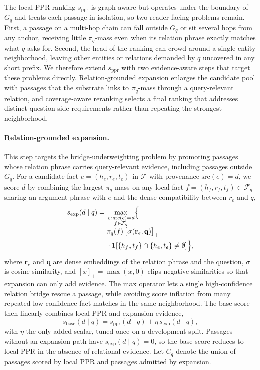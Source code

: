 The local PPR ranking $s_{\mathrm{ppr}}$ is graph-aware but operates
under the boundary of $G_q$ and treats each passage in isolation, so
two reader-facing problems remain. First, a passage on a multi-hop
chain can fall outside $G_q$ or sit several hops from any anchor,
receiving little $\pi_q$-mass even when its relation phrase exactly
matches what $q$ asks for. Second, the head of the ranking can crowd
around a single entity neighborhood, leaving other entities or
relations demanded by $q$ uncovered in any short prefix. We therefore
extend $s_{\mathrm{ppr}}$ with two evidence-aware steps that target
these problems directly. Relation-grounded expansion enlarges the
candidate pool with passages that the substrate links to $\pi_q$-mass
through a query-relevant relation, and coverage-aware reranking
selects a final ranking that addresses distinct question-side
requirements rather than repeating the strongest neighborhood.

\paragraph{Relation-grounded expansion.}
This step targets the bridge-underweighting problem by promoting
passages whose relation phrase carries query-relevant evidence,
including passages outside $G_q$. For a candidate fact
$e=(h_e, r_e, t_e)$ in $\mathcal{F}$ with provenance
$\mathrm{src}(e)=d$, we score $d$ by combining the largest
$\pi_q$-mass on any local fact $f=(h_f, r_f, t_f) \in \mathcal{F}_q$
sharing an argument phrase with $e$ and the dense compatibility
between $r_e$ and $q$,
\begin{equation}
\label{eq:expansion-score}
\begin{aligned}
s_{\mathrm{exp}}(d \mid q)
= {}& \max_{\substack{e:\,\mathrm{src}(e)=d \\ f \in \mathcal{F}_q}}
\Bigl\{\\[-0.3em]
&\pi_q(f)\,\bigl[\sigma(\mathbf{r}_e,\mathbf{q})\bigr]_{+}\\
&{}\cdot\mathbf{1}\!\left[
\{h_f,t_f\}\cap\{h_e,t_e\}\neq\emptyset
\right]\Bigr\},
\end{aligned}
\end{equation}
where $\mathbf{r}_e$ and $\mathbf{q}$ are dense embeddings of the
relation phrase and the question, $\sigma$ is cosine similarity, and
$[x]_{+}=\max(x,0)$ clips negative similarities so that expansion can
only add evidence. The max operator lets a single high-confidence
relation bridge rescue a passage, while avoiding score inflation from
many repeated low-confidence fact matches in the same neighborhood. The
base score then linearly combines local PPR and expansion evidence,
\begin{equation}
\label{eq:base-score}
s_{\mathrm{base}}(d \mid q)
=
s_{\mathrm{ppr}}(d \mid q)
+
\eta\,s_{\mathrm{exp}}(d \mid q),
\end{equation}
with $\eta$ the only added scalar, tuned once on a development split.
Passages without an expansion path have
$s_{\mathrm{exp}}(d \mid q)=0$, so the base score reduces to local PPR
in the absence of relational evidence. Let $C_q$ denote the union of
passages scored by local PPR and passages admitted by expansion.

